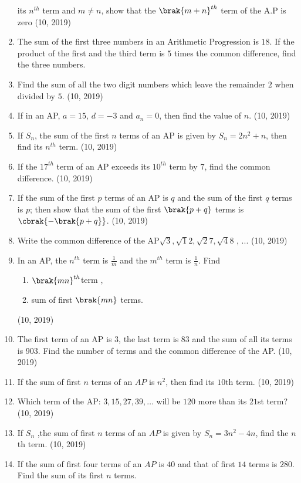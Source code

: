 \begin{enumerate}[label=\thesubsection.\arabic*,ref=\thesubsection.\theenumi,itemsep=1pt]
its $n^{th}$ term and $m \neq n$, show that the $\brak{m + n}^{th}$ term of the A.P is zero
\hfill (10, 2019) \item The sum of the first three numbers in an Arithmetic Progression is $18$. If the product of the first and the third term is $5$ times the common
difference, find the three numbers.
 \item Find the sum of all the two digit numbers which leave the remainder $2$ when divided by $5$.
\hfill (10, 2019) \item If in an AP, $a=15$, $d=-3$ and $a_n=0$, then find the value of $n$.
\hfill (10, 2019) \item If ${S_n}$, the sum of the first ${n}$ terms of an AP is given by ${S_n = 2n^2 + n}$, then find its $n^{th}$ term. 
\hfill (10, 2019) \item If the $17^{th}$ term of an AP exceeds its $10^{th}$ term by $7$, find the common difference.
\hfill (10, 2019) \item If the sum of the first $p$ terms of an AP is $q$ and the sum of the first $q$ terms is $p$; then show that the sum of the first $\brak{p + q}$ terms is $\cbrak {-\brak {p + q}}$.
%
\hfill (10, 2019) \item Write the common difference of the AP${\sqrt3} , {\sqrt12} , {\sqrt27} , {\sqrt48}$ , ... 
%
\hfill (10, 2019) \item In an AP, the $n^{th}$ term is ${\frac{1}{m}}$ and the $m^{th}$ term is $\frac{1}{n}$. Find 
\begin{enumerate}
      \item  $\brak{mn}^{th}$term  ,
      \item sum of first $\brak{mn}$ terms.
\end{enumerate}
\hfill (10, 2019)
%
 \item The first term of an AP is 3, the last term is 83 and the sum of all its terms is 903. Find the number of terms and the common difference of the AP.
\hfill (10, 2019) \item If the sum of first $n$ terms of an $AP$ is $n^2$, then find its $10$th term.
\hfill (10, 2019) \item Which term of the AP: $3, 15, 27, 39, \dots$ will be $120$ more than its $21$st term?
\hfill (10, 2019) \item If $S_n$ ,the sum of first $n$ terms of an $AP$ is given by $S_n=3n^2-4n$, find the $n$th term.
\hfill (10, 2019) \item If the sum of first four terms of an $AP$ is $40$ and that of first $14$ terms is $280$. Find the sum of its first $n$ terms.

\end{enumerate}

